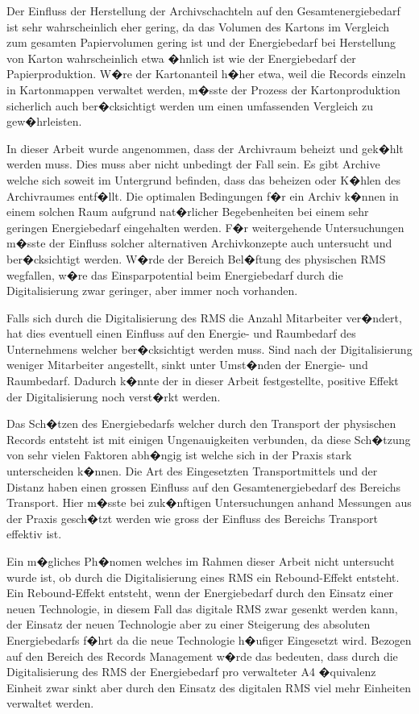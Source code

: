 \documentclass[a4paper,twoside,10pt]{report}
\begin{document}
Der Einfluss der Herstellung der Archivschachteln auf den Gesamtenergiebedarf ist sehr wahrscheinlich eher gering, da das Volumen des Kartons im Vergleich zum gesamten Papiervolumen gering ist und der Energiebedarf bei Herstellung von Karton wahrscheinlich etwa �hnlich ist wie der Energiebedarf der Papierproduktion. W�re der Kartonanteil h�her etwa, weil die Records einzeln in Kartonmappen verwaltet werden, m�sste der Prozess der Kartonproduktion sicherlich auch ber�cksichtigt werden um einen umfassenden Vergleich zu gew�hrleisten. 

In dieser Arbeit wurde angenommen, dass der Archivraum beheizt und gek�hlt werden muss. Dies muss aber nicht unbedingt der Fall sein. Es gibt Archive welche sich soweit im Untergrund befinden, dass das beheizen oder K�hlen des Archivraumes entf�llt. Die optimalen Bedingungen f�r ein Archiv k�nnen in einem solchen Raum aufgrund nat�rlicher Begebenheiten bei einem sehr geringen Energiebedarf eingehalten werden. F�r weitergehende Untersuchungen m�sste der Einfluss solcher alternativen Archivkonzepte auch untersucht und ber�cksichtigt werden. W�rde der Bereich Bel�ftung des physischen \ac{RMS} wegfallen, w�re das Einsparpotential beim Energiebedarf durch die Digitalisierung zwar geringer, aber immer noch vorhanden. \cite{archivesuisse} 

Falls sich durch die Digitalisierung des \ac{RMS} die Anzahl Mitarbeiter ver�ndert, hat dies eventuell einen Einfluss auf den Energie- und Raumbedarf des Unternehmens welcher ber�cksichtigt werden muss. Sind nach der Digitalisierung weniger Mitarbeiter angestellt, sinkt unter Umst�nden der Energie- und Raumbedarf. Dadurch k�nnte der in dieser Arbeit festgestellte, positive Effekt der Digitalisierung noch verst�rkt werden.
 
Das Sch�tzen des Energiebedarfs welcher durch den Transport der physischen Records entsteht ist mit einigen Ungenauigkeiten verbunden, da diese Sch�tzung von sehr vielen Faktoren abh�ngig ist welche sich in der Praxis stark unterscheiden k�nnen. Die Art des Eingesetzten Transportmittels und der Distanz haben einen grossen Einfluss auf den Gesamtenergiebedarf des Bereichs Transport. Hier m�sste bei zuk�nftigen Untersuchungen anhand Messungen aus der Praxis gesch�tzt werden wie gross der Einfluss des Bereichs Transport effektiv ist.

Ein m�gliches Ph�nomen welches im Rahmen dieser Arbeit nicht untersucht wurde ist, ob durch die Digitalisierung eines \ac{RMS} ein Rebound-Effekt entsteht. Ein Rebound-Effekt entsteht, wenn der Energiebedarf durch den Einsatz einer neuen Technologie, in diesem Fall das digitale \ac{RMS} zwar gesenkt werden kann, der Einsatz der neuen Technologie aber zu einer Steigerung des absoluten Energiebedarfs f�hrt da die neue Technologie h�ufiger Eingesetzt wird. Bezogen auf den Bereich des Records Management w�rde das bedeuten, dass durch die Digitalisierung des \ac{RMS} der Energiebedarf pro verwalteter A4 �quivalenz Einheit zwar sinkt aber durch den Einsatz des digitalen \ac{RMS} viel mehr Einheiten verwaltet werden. 
\end{document}
